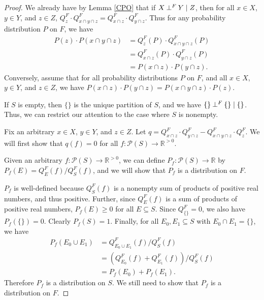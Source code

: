 \documentclass[authordate,onecolumn]{miri-tech-article}
\begin{document}
\begin{proof}
We already have by Lemma \ref{CPO} that if $X\mathbin{\perp^{F}}Y\mid Z$, then for all $x\in X$, $y\in Y$, and $z\in Z$, $Q^F_{z} \cdot Q^F_{x\cap y\cap z}=Q^F_{x\cap z} \cdot Q^F_{y\cap z}$. Thus for any probability distribution $P$ on $F$, we have 
\begin{equation}
\begin{split}
P(z)\cdot P(x\cap y\cap z)
& = Q^F_{z}(P) \cdot Q^F_{x\cap y\cap z}(P)\\
 & = Q^F_{x\cap z}(P) \cdot Q^F_{y\cap z}(P)\\
  & = P(x\cap z)\cdot P(y\cap z).
\end{split}
\end{equation}
Conversely, assume that for all probability distributions $P$ on $F$, and all $x\in X$, $y\in Y$, and $z\in Z$, we have $P(x\cap z)\cdot P(y\cap z)= P(x\cap y\cap z)\cdot P(z)$. 

If $S$ is empty, then $\{\}$ is the unique partition of $S$, and we have $\{\}\mathbin{\perp^{F}}\{\}\mid \{\}$. Thus, we can restrict our attention to the case where $S$ is nonempty. 

Fix an arbitrary $x\in X$, $y\in Y$, and $z\in Z$. Let $q=Q^F_{x\cap z}\cdot Q^F_{y\cap z}-Q^F_{x\cap y\cap z}\cdot Q^F_{z}$. We will first show that $q(f)=0$ for all $f:\mathcal{P}(S)\rightarrow \mathbb{R}^{>0}$.

Given an arbitrary $f:\mathcal{P}(S)\rightarrow \mathbb{R}^{>0}$, we can define $P_f:\mathcal{P}(S)\rightarrow \mathbb{R}$ by $P_f(E)=Q^F_E(f)/Q^F_S(f)$, and we will show that $P_f$ is a distribution on $F$.

$P_f$ is well-defined because $Q^F_S(f)$ is a nonempty sum of products of positive real numbers, and thus positive. Further, since $Q^F_E(f)$ is a sum of products of positive real numbers, $P_f(E)\geq 0$ for all $E\subseteq S$. Since $Q^F_{\{\}}=0$, we also have $P_f(\{\})=0$. Clearly $P_f(S)=1$. Finally, for all $E_0,E_1\subseteq S$ with $E_0\cap E_1=\{\}$, we have
\begin{equation}
\begin{split}
P_f(E_0\cup E_1)
& = Q^F_{E_0\cup E_1}(f)/Q^F_{S}(f)\\
 & = (Q^F_{E_0}(f)+Q^F_{E_1}(f))/Q^F_{S}(f)\\
  & = P_f(E_0)+P_f(E_1).
\end{split}
\end{equation}
Therefore $P_f$ is a distribution on $S$. We still need to show that $P_f$ is a distribution on $F$.


\end{proof}
\end{document}
